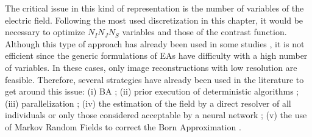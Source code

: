 			The critical issue in this kind of representation is the number of variables of the electric field. Following the most used discretization in this chapter, it would be necessary to optimize $N_IN_JN_S$ variables and those of the contrast function. Although this type of approach has already been used in some studies \citep{caorsi2004location,donelli2005computational}, it is not efficient since the generic formulations of EAs have difficulty with a high number of variables. In these cases, only image reconstructions with low resolution are feasible. Therefore, several strategies have already been used in the literature to get around this issue: (i) BA \citep{caorsi1991microwave,yang2021fft}; (ii) prior execution of deterministic algorithms \citep{brignone2008hybrid,liu2020combination}; (iii) parallelization \citep{massa2005parallel}; (iv) the estimation of the field by a direct resolver of all individuals \citep{huang2008time,huang2007microparticle} or only those considered acceptable by a neural network \citep{ashtari2010using,noghanian2014microwave}; (v) the use of Markov Random Fields to correct the Born Approximation \citep{caorsi1994microwave,caorsi2004microwave}.
			

